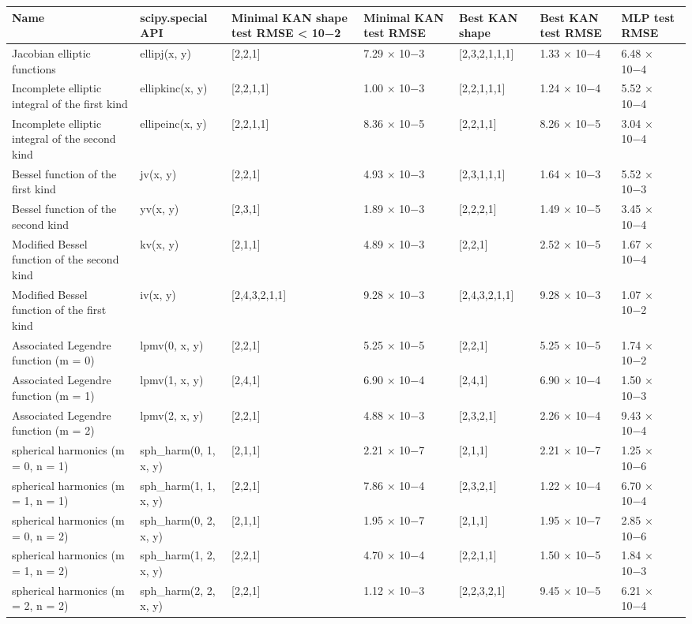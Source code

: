 \begin{tabular}{lllllll}
\toprule
Name & scipy.special API & Minimal KAN shape test RMSE < 10−2 & Minimal KAN test RMSE & Best KAN shape & Best KAN test RMSE & MLP test RMSE \\
\midrule
Jacobian elliptic functions & ellipj(x, y) & [2,2,1] & 7.29 × 10−3 & [2,3,2,1,1,1] & 1.33 × 10−4 & 6.48 × 10−4 \\
Incomplete elliptic integral of the first kind & ellipkinc(x, y) & [2,2,1,1] & 1.00 × 10−3 & [2,2,1,1,1] & 1.24 × 10−4 & 5.52 × 10−4 \\
Incomplete elliptic integral of the second kind & ellipeinc(x, y) & [2,2,1,1] & 8.36 × 10−5 & [2,2,1,1] & 8.26 × 10−5 & 3.04 × 10−4 \\
Bessel function of the first kind & jv(x, y) & [2,2,1] & 4.93 × 10−3 & [2,3,1,1,1] & 1.64 × 10−3 & 5.52 × 10−3 \\
Bessel function of the second kind & yv(x, y) & [2,3,1] & 1.89 × 10−3 & [2,2,2,1] & 1.49 × 10−5 & 3.45 × 10−4 \\
Modified Bessel function of the second kind & kv(x, y) & [2,1,1] & 4.89 × 10−3 & [2,2,1] & 2.52 × 10−5 & 1.67 × 10−4 \\
Modified Bessel function of the first kind & iv(x, y) & [2,4,3,2,1,1] & 9.28 × 10−3 & [2,4,3,2,1,1] & 9.28 × 10−3 & 1.07 × 10−2 \\
Associated Legendre function (m = 0) & lpmv(0, x, y) & [2,2,1] & 5.25 × 10−5 & [2,2,1] & 5.25 × 10−5 & 1.74 × 10−2 \\
Associated Legendre function (m = 1) & lpmv(1, x, y) & [2,4,1] & 6.90 × 10−4 & [2,4,1] & 6.90 × 10−4 & 1.50 × 10−3 \\
Associated Legendre function (m = 2) & lpmv(2, x, y) & [2,2,1] & 4.88 × 10−3 & [2,3,2,1] & 2.26 × 10−4 & 9.43 × 10−4 \\
spherical harmonics (m = 0, n = 1) & sph\_harm(0, 1, x, y) & [2,1,1] & 2.21 × 10−7 & [2,1,1] & 2.21 × 10−7 & 1.25 × 10−6 \\
spherical harmonics (m = 1, n = 1) & sph\_harm(1, 1, x, y) & [2,2,1] & 7.86 × 10−4 & [2,3,2,1] & 1.22 × 10−4 & 6.70 × 10−4 \\
spherical harmonics (m = 0, n = 2) & sph\_harm(0, 2, x, y) & [2,1,1] & 1.95 × 10−7 & [2,1,1] & 1.95 × 10−7 & 2.85 × 10−6 \\
spherical harmonics (m = 1, n = 2) & sph\_harm(1, 2, x, y) & [2,2,1] & 4.70 × 10−4 & [2,2,1,1] & 1.50 × 10−5 & 1.84 × 10−3 \\
spherical harmonics (m = 2, n = 2) & sph\_harm(2, 2, x, y) & [2,2,1] & 1.12 × 10−3 & [2,2,3,2,1] & 9.45 × 10−5 & 6.21 × 10−4 \\
\bottomrule
\end{tabular}
